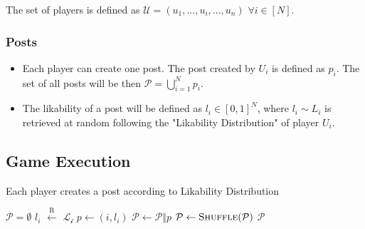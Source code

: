       The set of players is defined as $\mathcal{U} = ( u_1,..., u_i,..., u_n )$
      $\forall i \in \left[N\right]$.

    \subsubsection*{Posts}
      \begin{itemize}
        \item Each player can create one post. The post created by $U_i$ is
        defined as $p_i$. The set of all posts will be then $\mathcal{P} =
        \bigcup_{i=1}^N p_i$.
        \item The likability of a post will be defined as $l_i \in [0,1]^{N}$,
        where $l_i \sim L_i$ is retrieved at random following the "Likability
        Distribution" of player $U_i$.
      \end{itemize}
  \subsection{Game Execution}
    \begin{algorithm}
      \caption{Each player creates a post according to Likability Distribution}
      \label{alg:postGeneration}
      \begin{algorithmic}[1]
        \State $\mathcal{P} = \emptyset$ 
           \State $l_i$ $\xleftarrow{\text{R}}$ $\mathcal{L_i}$
           \State $p \leftarrow (i,l_i)$
           \State $\mathcal{P} \leftarrow \mathcal{P} \Vert p$
        \EndFor
        \State $\mathcal{P} \leftarrow \textsc{Shuffle}(\mathcal{P})$
        \State \Return $\mathcal{P}$
      \EndFunction
      \end{algorithmic}
    \end{algorithm}


